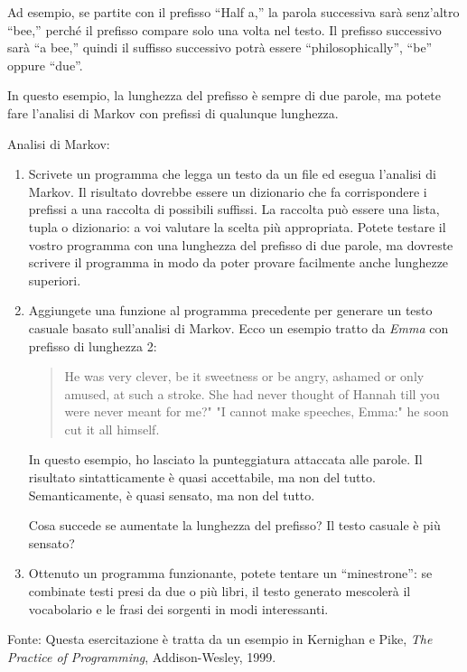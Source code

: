 \documentclass[10pt]{book}
\begin{document}
Ad esempio, se partite con il prefisso ``Half a,'' la parola successiva sarà senz'altro ``bee,'' perché il prefisso compare solo una volta nel testo. Il prefisso successivo sarà ``a bee,'' quindi il suffisso successivo potrà essere ``philosophically'', ``be'' oppure ``due''.

In questo esempio, la lunghezza del prefisso è sempre di due parole, ma potete fare l'analisi di Markov con prefissi di qualunque lunghezza.

\vspace{0.2in}
\begin{exercise}

Analisi di Markov:

\begin{enumerate}

\item Scrivete un programma che legga un testo da un file ed esegua l'analisi di Markov. Il risultato dovrebbe essere un dizionario che fa corrispondere i prefissi a una raccolta di possibili suffissi. La raccolta può essere una lista, tupla o dizionario: a voi valutare la scelta più appropriata. Potete testare il vostro programma con una lunghezza del prefisso di due parole, ma dovreste scrivere il programma in modo da poter provare facilmente anche lunghezze superiori.

\item Aggiungete una funzione al programma precedente per generare un testo casuale basato sull'analisi di Markov. Ecco un esempio tratto da {\em Emma} con prefisso di lunghezza 2: 

\begin{quote}
He was very clever, be it sweetness or be angry, ashamed or only
amused, at such a stroke. She had never thought of Hannah till you
were never meant for me?" "I cannot make speeches, Emma:" he soon cut
it all himself.
\end{quote}

In questo esempio, ho lasciato la punteggiatura attaccata alle parole. Il risultato sintatticamente è quasi accettabile, ma non del tutto. Semanticamente, è quasi sensato, ma non del tutto.

Cosa succede se aumentate la lunghezza del prefisso? Il testo casuale è più sensato?

\item Ottenuto un programma funzionante, potete tentare un ``minestrone'': se combinate testi presi da due o più libri, il testo generato mescolerà il vocabolario e le frasi dei sorgenti in modi interessanti.

\end{enumerate}

Fonte: Questa esercitazione è tratta da un esempio in Kernighan e
Pike, {\em The Practice of Programming}, Addison-Wesley, 1999.

\end{exercise}
\end{document}
